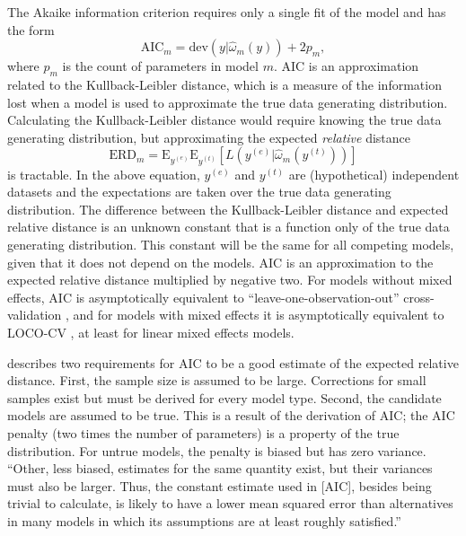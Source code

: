 The Akaike information criterion \parencite[AIC;][]{akaike1974new} requires only a single fit of the model and has the form
\begin{equation} \label{eq:aic}
	\mathrm{AIC}_m = \mathrm{dev}(y | \hat \omega_m(y)) + 2p_m
,\end{equation}
where $p_m$ is the count of parameters in model $m$. 
AIC is an approximation related to the Kullback-Leibler distance, which is a measure of the information lost when a model is used to approximate the true data generating distribution. Calculating the Kullback-Leibler distance would require knowing the true data generating distribution, but approximating the expected \emph{relative} distance 
\begin{equation}
	\mathrm{ERD}_m = \mathrm{E}_{y^{(e)}} \mathrm{E}_{y^{(t)}} [L(y^{(e)} |\hat \omega_m(y^{(t)}))]
\end{equation}
is tractable.
In the above equation, $y^{(e)}$ and $y^{(t)}$ are (hypothetical) independent datasets and the expectations are taken over the true data generating distribution. The difference between the Kullback-Leibler distance and expected relative distance is an unknown constant that is a function only of the true data generating distribution. This constant will be the same for all competing models, given that it does not depend on the models. 
AIC is an approximation to the expected relative distance multiplied by negative two. For models without mixed effects, AIC is asymptotically equivalent to  ``leave-one-observation-out'' cross-validation \parencite{stone1977asymptotic}, and for models with mixed effects it is asymptotically equivalent to LOCO-CV \parencite{fang2011asymptotic}, at least for linear mixed effects models.

\textcite{Kuha2004} describes two requirements for AIC to be a good estimate of the expected relative distance. First, the sample size is assumed to be large. Corrections for small samples exist but must be derived for every model type. Second, the candidate models are assumed to be true. This is a result of the derivation of AIC; the AIC penalty (two times the number of parameters) is a property of the true distribution. For untrue models, the penalty is biased but has zero variance. ``Other, less biased, estimates for the same quantity exist, but their variances must also be larger. Thus, the constant estimate used in [AIC], besides being trivial to calculate, is likely to have a lower mean squared error than alternatives in many models in which its assumptions are at least roughly satisfied.''


